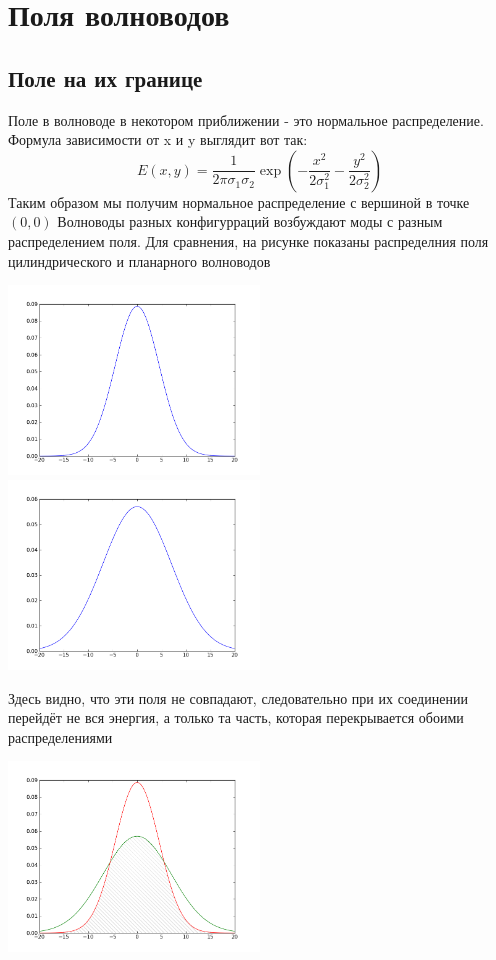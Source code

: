 \chapter{Поля волноводов}
\section{Поле на их границе}
Поле в волноводе в некотором приближении - это нормальное распределение. Формула зависимости от x и y 
выглядит вот так:
\begin{equation}
  \label{gauss2d}
  E(x,y)=\frac{1}{2\pi\sigma_1\sigma_2}\exp\left(-\frac{x^2}{2\sigma_1^2}-\frac{y^2}{2\sigma_2^2}\right)
\end{equation}
Таким образом мы получим нормальное распределение с вершиной в точке $(0,0)$
Волноводы разных конфигурраций возбуждают моды с разным распределением поля. Для сравнения, на рисунке показаны распределния поля цилиндрического и планарного волноводов

\noindent
\includegraphics[width=0.5\textwidth]{img/cylinderGauss.png}
\includegraphics[width=0.5\textwidth]{img/planarGauss.png}

Здесь видно, что эти поля не совпадают, следовательно при их соединении перейдёт не вся энергия, а только та часть, которая перекрывается обоими распределениями

\includegraphics[width=0.5\textwidth]{img/intersection.png}

